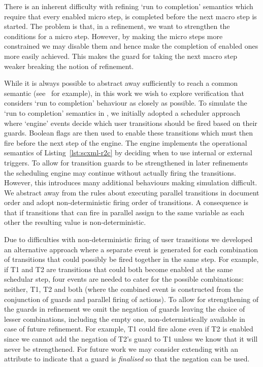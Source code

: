 There is an inherent difficulty with refining `run to completion' semantics which require that every enabled micro step, is completed before the next macro step is started. The problem is that, in a refinement, we want to strengthen the conditions for a micro step. However, by making the micro steps more constrained we may disable them and hence make the completion of enabled ones more easily achieved. This makes the guard for taking the next macro step weaker breaking the notion of refinement.

While it is always possible to abstract away sufficiently to reach a common semantic (see~\cite{Snook12:FMCO} for example), in this work we wish to explore verification that considers `run to completion' behaviour as closely as possible.    
To simulate the `run to completion' semantics in \EventB, we initially adopted a scheduler approach where `engine' events decide which user transitions should be fired based on their guards. 
Boolean flags are then used to enable these transitions which must then fire before the next step of the engine.
The engine implements the operational semantics of Listing~\ref{lst:scxml-r2c} by deciding when to use internal or external triggers.
To allow for transition guards to be strengthened in later refinements the scheduling engine may continue without actually firing the transitions.
However, this introduces many additional behaviours making simulation difficult.
We abstract away from the \SCXML rules about executing parallel transitions in document order and adopt non-deterministic firing order of transitions. 
A consequence is that if transitions that can fire in parallel assign to the same variable as each other the resulting value is non-deterministic.

Due to difficulties with non-deterministic firing of user transitions we developed an alternative approach where a separate event is generated for each combination of transitions that could possibly be fired together in the same step. 
For example, if T1 and T2 are transitions that could both become enabled at the same schedular step, four events are needed to cater for the possible combinations: neither, T1, T2 and both (where the combined event is constructed from the conjunction of guards and parallel firing of actions). 
To allow for strengthening of the guards  in refinement we omit the negation of guards
leaving the choice of lesser combinations, including the empty one, non-determistically available in case of future refinement.
For example, T1 could fire alone even if T2 is enabled since we cannot add the negation of T2's guard to T1 unless we know that it will never be strengthened. 
For future work we may consider extending \SCXML with an attribute to indicate that a guard is \emph{finalised} so that the negation can be used.


